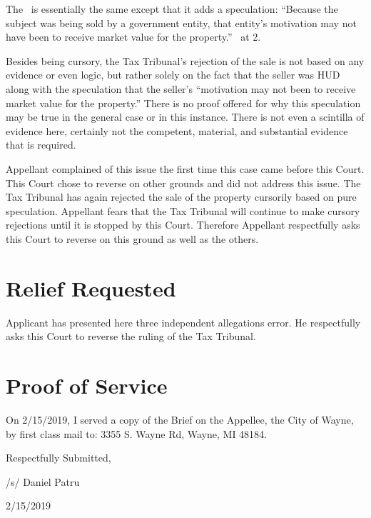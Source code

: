 \documentclass[12pt,\documentclassflag]{michiganCourtOfAppealsBrief}
\begin{document}
The \reconsiderationDenied\ is essentially the same except that it adds a speculation: ``Because the subject was being sold by a government entity, that entity's motivation may not have been to receive market value for the property.'' \reconsiderationDenied\ at 2.

Besides being cursory, the Tax Tribunal's rejection of the sale is not based on any evidence or even logic, but rather solely on the fact that the seller was HUD along with the speculation that the seller's ``motivation may not been to receive market value for the property.'' There is no proof offered for why this speculation may be true in the general case or in this instance. There is not even a scintilla of evidence here, certainly not the competent, material, and substantial evidence that is required.

Appellant complained of this issue the first time this case came before this Court. This Court chose to reverse on other grounds and did not address this issue. The Tax Tribunal has again rejected the sale of the property cursorily based on pure speculation. Appellant fears that the Tax Tribunal will continue to make cursory rejections until it is stopped by this Court. Therefore Appellant respectfully asks this Court to reverse on this ground as well as the others. 

\section{Relief Requested}

Applicant has presented here three independent allegations error. He respectfully asks this Court to reverse the ruling of the Tax Tribunal. 

\section{Proof of Service}

On 2/15/2019, I served a copy of the Brief on the Appellee, the City of Wayne, by first class mail to: 3355 S. Wayne Rd, Wayne, MI 48184. 

\vspace{1\baselineskip}

{ \setlength{\leftskip}{3.5in}

  Respectfully Submitted,

  /s/ Daniel Patru

  2/15/2019

  \setlength{\leftskip}{0pt}}

\newpage\empty%
\end{document}
